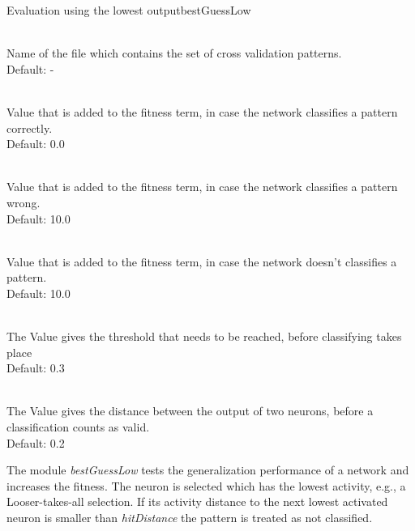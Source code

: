 \begin{moduledoc}{Evaluation using the lowest output}{bestGuessLow}


\item[\KeyWord{crossPattern} \optParam{name}]~\\
Name of the file which contains the set of cross validation patterns.\\
Default: -


\item[\KeyWord{hitRating} \optParam{f}]~\\
Value that is added to the fitness term, in case the network classifies a
pattern correctly.\\
Default: 0.0

\item[\KeyWord{missRating} \optParam{f}]~\\  
Value that is added to the fitness term, in case the network classifies a
pattern wrong.\\
Default: 10.0

\item[\KeyWord{noneRating} \optParam{f}]~\\ 
Value that is added to the fitness term, in case the network doesn't classifies a
pattern.\\
Default: 10.0

\item[\KeyWord{hitThreshold} \optParam{f}]~\\ 
The Value gives the threshold that needs to be reached, before classifying takes place\\
Default: 0.3

\item[\KeyWord{hitDistance} \optParam{f}]~\\ 
The Value gives the distance between the output of two neurons, before a classification
counts as valid.\\
Default: 0.2


\end{moduledoc}


The module  {\it bestGuessLow} tests the generalization performance of a network
and increases the fitness.
The neuron is selected which has the lowest activity, e.g., a Looser-takes-all
selection.
 If its activity
distance to the next lowest activated neuron is smaller than {\it hitDistance} 
the pattern is  treated as not classified.



